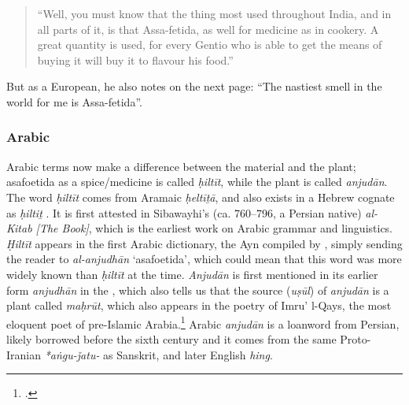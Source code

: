 \begin{quote}
    ``Well, you must know that the thing most used throughout India, and in all parts of it, is that Assa-fetida, as well for medicine as in cookery. A great quantity is used, for every Gentio who is able to get the means of buying it will buy it to flavour his food.'' \autocite[44]{garcia_da_orta_colloquies_1913}
\end{quote}

But as a European, he also notes on the next page: ``The nastiest smell in the world for me is Assa-fetida''.



\subsubsection{Arabic}



Arabic terms now make a difference between the material and the plant; asafoetida as a spice/medicine is called 
\textit{ḥiltīt}, while the plant is called  \textit{anjudān}.
The word \textit{ḥiltīt} comes from Aramaic  \textit{ḥeltīṯā}, and also exists in a Hebrew cognate as  \textit{ḥiltiṯ}
\autocites[140]{fraenkel_aramaischen_1886}[36]{low_aramaeische_1881}[Vol. 3, p. 452-455]{low_flora_1924}. It is first attested in Sibawayhi's (ca. 760--796, a Persian native) \textit{al-Kitab [The Book]}, which is the earliest work on Arabic grammar and linguistics. \textit{Ḥiltīt} appears in the first Arabic dictionary, the \gls{Ayn} compiled by \textcite{al-farahidi_kitab_786}, simply sending the reader to \textit{al-anjudhān} `asafoetida', which could mean that this word was more widely known than \textit{ḥiltīt} at the time. \textit{Anjudān} is first mentioned in its earlier form  
\textit{anjudhān} in the , which also tells us that the source (\textit{u\d{s}\={u}l}) of \textit{anjudān} is a plant called \textit{maḥrūt}, which also appears in the poetry of Imru' l-Qays, the most eloquent poet of pre-Islamic Arabia.\footcite[see][819]{ibn_manzur_lisan_1979} Arabic \textit{anjudān} is a loanword from Persian, likely borrowed before the sixth century and it comes from the same Proto-Iranian \textit{*aṅgu-ǰatu-} as Sanskrit, and later English \textit{hing}.





